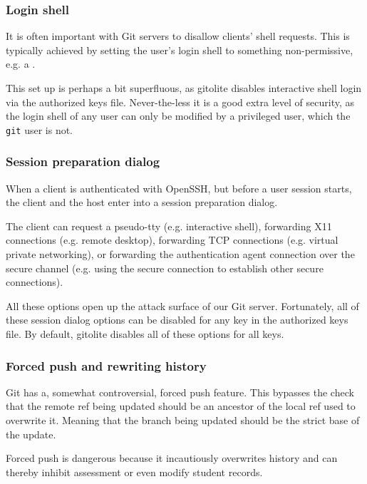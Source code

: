 \subsubsection{Login shell}

It is often important with Git servers to disallow clients' shell requests.
This is typically achieved by setting the user's login shell to something
non-permissive, e.g. a \cite{man-1-git-shell}.

This set up is perhaps a bit superfluous, as gitolite disables interactive
shell login via the authorized keys file. Never-the-less it is a good extra
level of security, as the login shell of any user can only be modified by a
privileged user, which the \texttt{git} user is not.

\subsubsection{Session preparation dialog}

When a client is authenticated with OpenSSH, but before a user session starts,
the client and the host enter into a session preparation dialog.

The client can request a pseudo-tty (e.g. interactive shell), forwarding X11
connections (e.g. remote desktop), forwarding TCP connections (e.g. virtual
private networking), or forwarding the authentication agent connection over the
secure channel (e.g. using the secure connection to establish other secure
connections).

All these options open up the attack surface of our Git server. Fortunately,
all of these session dialog options can be disabled for any key in the
authorized keys file\cite{man-8-sshd}. By default, gitolite disables all of
these options for all keys.

\subsubsection{Forced push and rewriting history}\label{section:forced-push}

Git has a, somewhat controversial\cite{torvalds-2007,hamano-2009,rego-2013},
forced push feature. This bypasses the check that the remote ref being updated
should be an ancestor of the local ref used to overwrite
it\cite{man-1-git-push}. Meaning that the branch being updated should be the
strict base of the update.

Forced push is dangerous because it incautiously overwrites history and can
thereby inhibit assessment or even modify student records.

